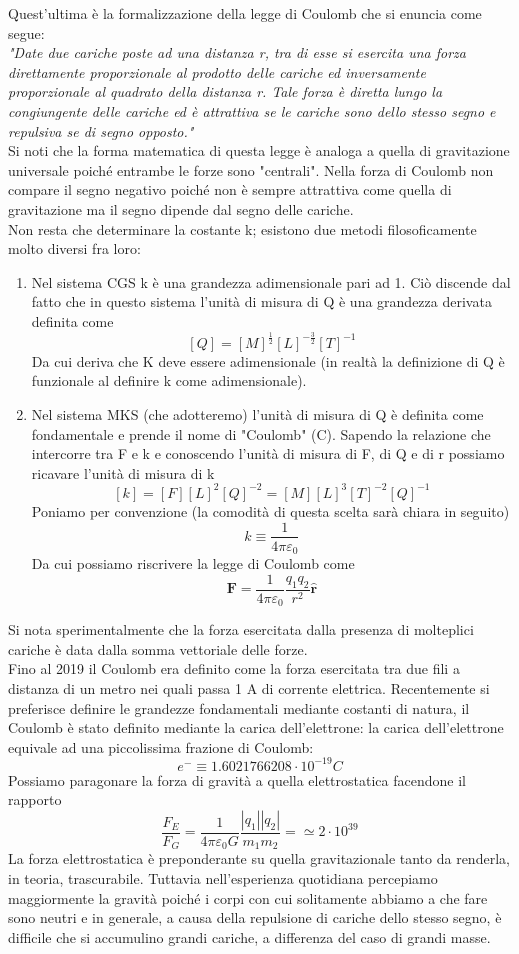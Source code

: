 \documentclass[
10pt, %
a4paper, %
oneside, %
headinclude,footinclude, %
BCOR5mm, %
]{scrartcl}
\begin{document}
Quest'ultima è la formalizzazione della legge di Coulomb che si enuncia come segue:\\
\textit{"Date due cariche poste ad una distanza r, tra di esse si esercita una forza direttamente proporzionale al prodotto delle cariche ed inversamente proporzionale al quadrato della distanza r. Tale forza è diretta lungo la congiungente delle cariche ed è attrattiva se le cariche sono dello stesso segno e repulsiva se di segno opposto."}\\
Si noti che la forma matematica di questa legge è analoga a quella di gravitazione universale poiché entrambe le forze sono "centrali". Nella forza di Coulomb non compare il segno negativo poiché non è sempre attrattiva come quella di gravitazione ma il segno dipende dal segno delle cariche.\\
Non resta che determinare la costante k; esistono due metodi filosoficamente molto diversi fra loro:
\begin{enumerate}
	\item Nel sistema CGS  k è una grandezza adimensionale pari ad 1. Ciò discende dal fatto che in questo sistema l'unità di misura di Q è una grandezza derivata definita come
	\[[Q] = [M]^{\frac{1}{2}}[L]^{-\frac{3}{2}}[T]^{-1}\]
	Da cui deriva che K deve essere adimensionale (in realtà la definizione di Q è funzionale al definire k come adimensionale).
	\item Nel sistema MKS (che adotteremo) l'unità di misura di Q è definita come fondamentale e prende il nome di "Coulomb" (C). Sapendo la relazione che intercorre tra F e k e conoscendo l'unità di misura di F, di Q e di r possiamo ricavare l'unità di misura di k
	\[[k] = [F][L]^2[Q]^{-2} = [M][L]^3[T]^{-2}[Q]^{-1}\]
	Poniamo per convenzione (la comodità di questa scelta sarà chiara in seguito)
	\[k \equiv \frac{1}{4\pi\varepsilon_0}\]
	Da cui possiamo riscrivere la legge di Coulomb come
	\[\mathbf{F} = \frac{1}{4\pi\varepsilon_0}\frac{q_1q_2}{r^2}\hat{\mathbf{r}}\]
\end{enumerate}
Si nota sperimentalmente che la forza esercitata dalla presenza di molteplici cariche è data dalla somma vettoriale delle forze.\\
Fino al 2019 il Coulomb era definito come la forza esercitata tra due fili a distanza di un metro nei quali passa 1 A di corrente elettrica. Recentemente si preferisce definire le grandezze fondamentali mediante costanti di natura, il Coulomb è stato definito mediante la carica dell'elettrone: la carica dell'elettrone equivale ad una piccolissima frazione di Coulomb: 
\[e^- \equiv 1.6021766208\cdot10^{-19} C\]
Possiamo paragonare la forza di gravità a quella elettrostatica facendone il rapporto
\[\frac{F_E}{F_G} = \frac{1}{4\pi\varepsilon_0 G}\frac{|q_1||q_2|}{m_1m_2}=\simeq 2\cdot10^{39}\]
La forza elettrostatica è preponderante su quella gravitazionale tanto da renderla, in teoria, trascurabile. Tuttavia nell'esperienza quotidiana percepiamo maggiormente la gravità poiché i corpi con cui solitamente abbiamo a che fare sono neutri e in generale, a causa della repulsione di cariche dello stesso segno, è difficile che si accumulino grandi cariche, a differenza del caso di grandi masse.
\end{document}

